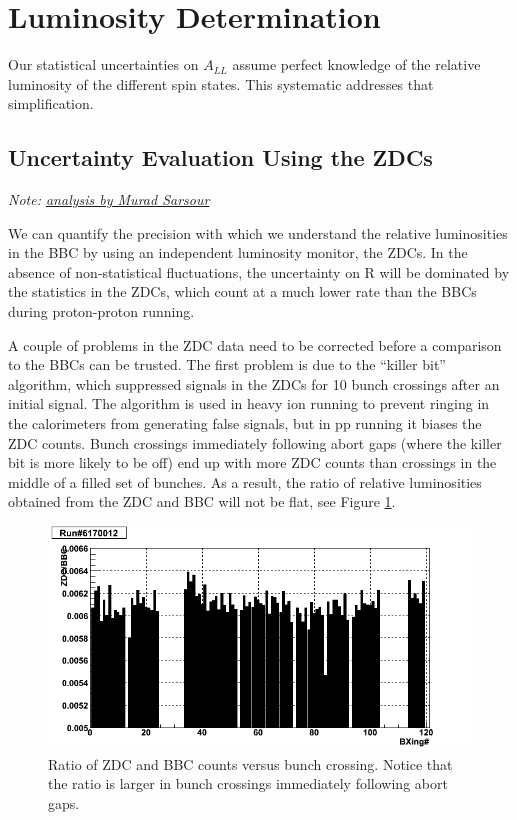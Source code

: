 \section{Luminosity Determination}

Our statistical uncertainties on $A_{LL}$ assume perfect knowledge of the relative luminosity of the different spin states.  This systematic addresses that simplification.

\subsection{Uncertainty Evaluation Using the ZDCs}

\textit{Note: \href{http://mare.tamu.edu/star/2005n06Jets/2005relLumSys_mar29_2008/}{analysis by Murad Sarsour}}

We can quantify the precision with which we understand the relative luminosities in the BBC by using an independent luminosity monitor, the ZDCs.  In the absence of non-statistical fluctuations, the uncertainty on R will be dominated by the statistics in the ZDCs, which count at a much lower rate than the BBCs during proton-proton running.

A couple of problems in the ZDC data need to be corrected before a comparison to the BBCs can be trusted.  The first problem is due to the ``killer bit'' algorithm, which suppressed signals in the ZDCs for 10 bunch crossings after an initial signal.  The algorithm is used in heavy ion running to prevent ringing in the calorimeters from generating false signals, but in pp running it biases the ZDC counts.  Bunch crossings immediately following abort gaps (where the killer bit is more likely to be off) end up with more ZDC counts than crossings in the middle of a filled set of bunches.  As a result, the ratio of relative luminosities obtained from the ZDC and BBC will not be flat, see Figure \ref{fig:zdctobbc6170012zoom}.

\begin{figure}
  \includegraphics[width=1.0\textwidth]{figures/zdctobbc6170012zoom}
  \caption{Ratio of ZDC and BBC counts versus bunch crossing.  Notice that the ratio is larger in bunch crossings immediately following abort gaps.}
  \label{fig:zdctobbc6170012zoom}
\end{figure}

